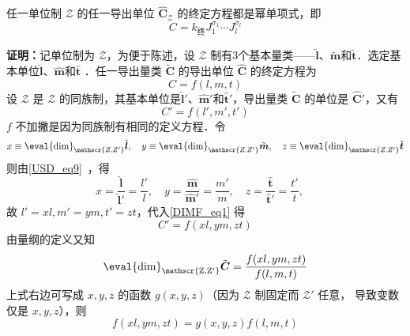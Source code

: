 \begin{theorem}{}\label{DIMF_the2}
任一单位制 $\mathscr{Z}$ 的任一导出单位 $\hat{\boldsymbol{C}}_{ \mathscr{Z}}$ 的终定方程都是幂单项式，即
\begin{equation}\label{DIMF_eq6}
C=k_{\text{终}}J_1^{\sigma_1}\cdots J_l^{\sigma_l}
\end{equation}
\end{theorem}
\textbf{证明：}记单位制为 $\mathscr{Z}$，为便于陈述，设 $\mathscr{Z}$ 制有3个基本量类——$\tilde{\boldsymbol{l}}$、$\tilde{\boldsymbol{m}}$和$\tilde{\boldsymbol{t}}$．选定基本单位$\hat{\boldsymbol{l}}$、$\hat{\boldsymbol{m}}$和$\hat{\boldsymbol{t}}$ ．任一导出量类 $\tilde{\boldsymbol{C}}$ 的导出单位 $\hat{\boldsymbol{C}}$ 的终定方程为
\begin{equation}
C=f(l,m,t)
\end{equation}
设 $\mathscr{Z}$ 是 $\mathscr{Z}$ 的同族制，其基本单位是$\hat{\boldsymbol{l}}'$、$\hat{\boldsymbol{m}}'$和$\hat{\boldsymbol{t}}'$，导出量类 $\tilde{\boldsymbol{C}}$ 的单位是  $\hat{\boldsymbol{C}}'$，又有
\begin{equation}\label{DIMF_eq1}
C'=f(l',m',t')
\end{equation}
$f$ 不加撇是因为同族制有相同的定义方程．令
\begin{equation}
x\equiv \eval{\mathrm{dim}}_{\mathscr{Z,Z'}}\tilde{\boldsymbol{l}},\quad y\equiv \eval{\mathrm{dim}}_{\mathscr{Z,Z'}}\tilde{\boldsymbol{m}},\quad z\equiv \eval{\mathrm{dim}}_{\mathscr{Z,Z'}}\tilde{\boldsymbol{t}}
\end{equation}
则由\autoref{USD_eq9}~，得
\begin{equation}
x=\frac{\hat{\boldsymbol{l}}}{\hat{\boldsymbol{l}}'}=\frac{l'}{l},\quad y=\frac{\hat{\boldsymbol{m}}}{\hat{\boldsymbol{m}}'}=\frac{m'}{m},\quad z=\frac{\hat{\boldsymbol{t}}}{\hat{\boldsymbol{t}}'}=\frac{t'}{t},\quad 
\end{equation}
故 $l'=xl,m'=ym,t'=zt$，代入\autoref{DIMF_eq1} 得
\begin{equation}
C'=f(xl,ym,zt)
\end{equation}
由量纲的定义又知
\begin{equation}
\mathrm{\eval{dim}_{\mathscr{Z,Z'
}}}\tilde{\boldsymbol{C}}=\frac{f(xl,ym,zt)}{f(l,m,t)}
\end{equation}
上式右边可写成 $x,y,z$ 的函数 $g(x,y,z)$（因为 $\mathcal{Z}$ 制固定而 $\mathscr{Z'}$ 任意， 导致变数仅是 $x,y,z$），则
\begin{equation}\label{DIMF_eq2}
f(xl,ym,zt)=g(x,y,z)f(l,m,t)
\end{equation}
